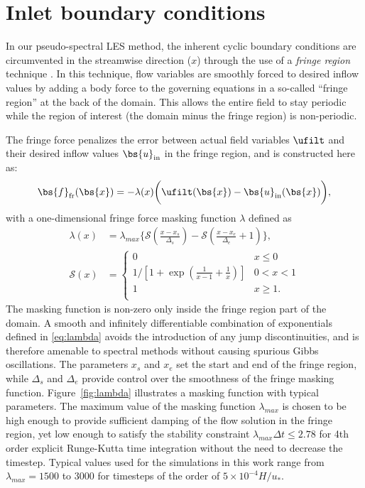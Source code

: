 \section{Inlet boundary conditions}\label{sec:meth_fringe}
In our pseudo-spectral LES method, the inherent cyclic boundary conditions are circumvented in the streamwise direction ($x$) through the use of a \emph{fringe region} technique \citep{spalart1993experimental,lundbladh1999efficient,nordstrom1999fringe}. In this technique, flow variables are smoothly forced to desired inflow values by adding a body force to the governing equations in a so-called ``fringe region'' at the back of the domain. This allows the entire field to stay periodic while the region of interest (the domain minus the fringe region) is non-periodic.

The fringe force penalizes the error between actual field variables $\ufilt$ and their desired inflow values $\bs{u}_\text{in}$ in the fringe region, and is constructed here as:
\begin{equation}\label{eq:fringeforcing}
	\bs{f}_{\text{fr}}(\bs{x}) =  - \lambda(x) \bigg(\ufilt(\bs{x}) - \bs{u}_{\text{in}}(\bs{x})  \bigg),
\end{equation}
with a one-dimensional fringe force masking function $\lambda$ defined as \citep{lundbladh1999efficient}
\begin{align}
\lambda(x) &= \lambda_{max} \bigg \{ \mathcal{S}\left( \frac{x - x_s}{\Delta_s} \right) - \mathcal{S} \left( \frac{x - x_e}{\Delta_e} + 1 \right) \bigg \} \nonumber,\\
\mathcal{S}(x) &=
\begin{cases}
0                  & x \le 0        \\
1/[1 + \exp(\frac{1}{x-1} + \frac{1}{x})]             & 0 < x < 1   \\
1                        & x \ge 1 .  \\
\end{cases} \label{eq:lambda}
\end{align}
The masking function is non-zero only inside the fringe region part of the domain. A smooth and infinitely differentiable combination of exponentials defined in \eqref{eq:lambda} avoids the introduction of any jump discontinuities, and is therefore amenable to spectral methods without causing spurious Gibbs oscillations. The parameters $x_s$ and $x_e$ set the start and end of the fringe region, while $\Delta_s$ and $\Delta_e$ provide control over the smoothness of the fringe masking function. Figure~\ref{fig:lambda} illustrates a masking function with typical parameters. The maximum value of the masking function $\lambda_{max}$ is chosen to be high enough to provide sufficient damping of the flow solution in the fringe region, yet low enough to satisfy the stability constraint $\lambda_{max}\Delta t \le 2.78$ for 4th order explicit Runge-Kutta time integration \citep{schlatter2005windowing} without the need to decrease the timestep. Typical values used for the simulations in this work range from $\lambda_{max} = 1 500$ to $3 000$ for timesteps of the order of $5 \times 10^{-4} H/u_*$.

